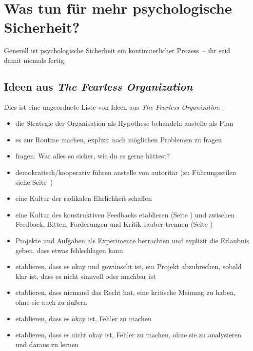 \section{Was tun für mehr psychologische Sicherheit?}
\label{ws-was-tun}

Generell ist psychologische Sicherheit ein kontinuierlicher Prozess~-- ihr seid damit niemals \glqq fertig\grqq.

\subsection{Ideen aus \emph{The Fearless Organization}}

Dies ist eine ungeordnete Liste von Ideen aus \emph{The Fearless Organization} \cite{the-fearless-organisation}.

\begin{itemize}
  \item die Strategie der Organisation als Hypothese behandeln anstelle als Plan  
  \item es zur Routine machen, explizit nach möglichen Problemen zu fragen  
  \item fragen: \glqq War alles so sicher, wie du es gerne hättest?\grqq {}
  \item demokratisch/kooperativ führen anstelle von autoritär (zu Führungsstilen siehe Seite~\pageref{fuehrungsstile}) 
  \item eine Kultur der radikalen Ehrlichkeit \cite{radical-honesty} schaffen 
  \item eine Kultur des konstruktiven Feedbacks etablieren (Seite \pageref{feedback-regeln}) und zwischen Feedback, Bitten, Forderungen und Kritik sauber trennen  (Seite \pageref{feedback-vs-kritik})
  \item Projekte und Aufgaben als Experimente betrachten und explizit die Erlaubnis geben, dass etwas fehlschlagen kann 
  \item etablieren, dass es okay und gewünscht ist, ein Projekt abzubrechen, sobald klar ist, dass es nicht sinnvoll oder machbar ist 
  \item etablieren, dass niemand das Recht hat, eine kritische Meinung zu haben, ohne sie auch zu äußern
  \item etablieren, dass es okay ist, Fehler zu machen 
  \item etablieren, dass es nicht okay ist, Fehler zu machen, ohne sie zu analysieren und daraus zu lernen

\end{itemize}
